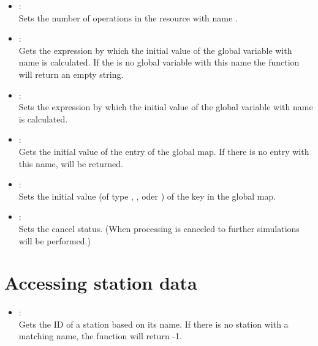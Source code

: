 \begin{itemize}
\item
{}:\\
Sets the number of operations in the resource with name .

\item
{}:\\
Gets the expression by which the initial value of the global variable with
name  is calculated. If the is no global variable with
this name the function will return an empty string.

\item
{}:\\
Sets the expression by which the initial value of the global variable with
name  is calculated.

\item
{}:\\
Gets the initial value of the entry  of the global map.
If there is no entry with this name,  will be returned.

\item
{}:\\
Sets the initial value (of type , ,  oder ) of the key 
in the global map.

\item
{}:\\
Sets the cancel status. (When processing is canceled to further simulations will be performed.)

\end{itemize}

\section{Accessing station data}

\begin{itemize}

\item
{}:\\
Gets the ID of a station based on its name.
If there is no station with a matching name, the function will return -1.

\end{itemize}

